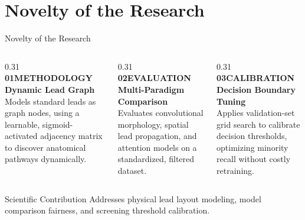 \documentclass[11pt,aspectratio=169]{beamer}
\begin{document}
\section{Novelty of the Research}
\begin{frame}{Novelty of the Research}
    \begin{columns}[T]
        \begin{column}{0.31\textwidth}
            {\color{rust}\fontsize{7}{9}\selectfont\sffamily\bfseries 01\quad METHODOLOGY}\\[0.1cm]
            {\color{slate}\rmfamily\bfseries Dynamic Lead Graph}\\[0.15cm]
            \fontsize{8}{10}\selectfont Models standard leads as graph nodes, using a learnable, sigmoid-activated adjacency matrix to discover anatomical pathways dynamically.
        \end{column}
        \begin{column}{0.31\textwidth}
            {\color{teal}\fontsize{7}{9}\selectfont\sffamily\bfseries 02\quad EVALUATION}\\[0.1cm]
            {\color{slate}\rmfamily\bfseries Multi-Paradigm Comparison}\\[0.15cm]
            \fontsize{8}{10}\selectfont Evaluates convolutional morphology, spatial lead propagation, and attention models on a standardized, filtered dataset.
        \end{column}
        \begin{column}{0.31\textwidth}
            {\color{rust}\fontsize{7}{9}\selectfont\sffamily\bfseries 03\quad CALIBRATION}\\[0.1cm]
            {\color{slate}\rmfamily\bfseries Decision Boundary Tuning}\\[0.15cm]
            \fontsize{8}{10}\selectfont Applies validation-set grid search to calibrate decision thresholds, optimizing minority recall without costly retraining.
        \end{column}
    \end{columns}
    \vspace{0.3cm}
    \begin{block}{Scientific Contribution}
        Addresses physical lead layout modeling, model comparison fairness, and screening threshold calibration.
    \end{block}
\end{frame}

\end{document}
